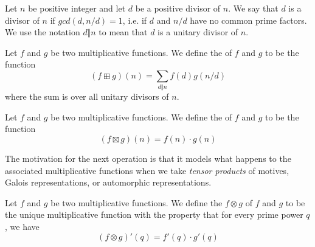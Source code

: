 \documentclass[a4paper]{article}
\begin{document}
\begin{definition}
Let $n$ be positive integer and let $d$ be a positive divisor of $n$. We say that $d$ is a  divisor of $n$ if $gcd(d, n/d) = 1$, i.e. if $d$ and $n/d$ have no common prime factors. We use the notation $d \Vert n$ to mean that $d$ is a unitary divisor of $n$. 
\end{definition}

\begin{definition}
Let $f$ and $g$ be two multiplicative functions. We define the  of $f$ and $g$ to be the function
$$ (f \boxplus g)(n) =  \sum_{d \Vert n} f(d) g(n/d)  $$
where the sum is over all unitary divisors of $n$. 
\end{definition}

\begin{definition}
Let $f$ and $g$ be two multiplicative functions. We define the  of $f$ and $g$ to be the function
$$ (f \boxtimes g)(n) = f(n) \cdot g(n)   $$
\end{definition}
The motivation for the next operation is that it models what happens to the associated multiplicative functions when we take \emph{tensor products} of motives, Galois representations, or automorphic representations.

\begin{definition}
Let $f$ and $g$ be two multiplicative functions. We define the  $f \otimes g$ of $f$ and $g$ to be the unique multiplicative function with the property that for every prime power $q$, we have
$$ (f \otimes g)'(q) = f'(q) \cdot g'(q)    $$
\end{definition}
\end{document}
